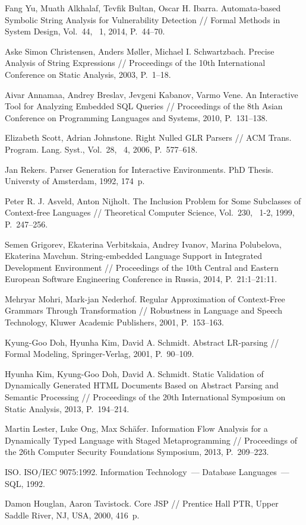 \documentclass{llncs}
\begin{document}
%
%
\begin{thebibliography}{}
%
Fang Yu, Muath Alkhalaf, Tevfik Bultan, Oscar H. Ibarra.
Automata-based Symbolic String Analysis for Vulnerability Detection //
Formal Methods in System Design, Vol.~44, \textnumero~1, 2014, P.~44--70.

Aske Simon Christensen, Anders M{\o}ller, Michael I. Schwartzbach.
Precise Analysis of String Expressions //
Proceedings of the 10th International Conference on Static Analysis, 2003, P.~1--18.

Aivar Annamaa, Andrey Breslav, Jevgeni Kabanov, Varmo Vene.
An Interactive Tool for Analyzing Embedded SQL Queries //
Proceedings of the 8th Asian Conference on Programming Languages and Systems, 2010, P.~131--138.

Elizabeth Scott, Adrian Johnstone.
Right Nulled GLR Parsers // ACM Trans. Program. Lang. Syst., Vol.~28, \textnumero~4,
2006, P.~577--618.

Jan Rekers.
Parser Generation for Interactive Environments. PhD Thesis. Universty of Amsterdam, 1992, 174~p.

Peter R. J. Asveld, Anton Nijholt.
The Inclusion Problem for Some Subclasses of Context-free Languages //
Theoretical Computer Science, Vol.~230, \textnumero~1-2, 1999, P.~247--256.

Semen Grigorev, Ekaterina Verbitskaia, Andrey Ivanov, Marina Polubelova, Ekaterina Mavchun.
String-embedded Language Support in Integrated Development Environment //
Proceedings of the 10th Central and Eastern European Software Engineering Conference in Russia, 2014, P.~21:1--21:11.

Mehryar Mohri, Mark-jan Nederhof.
Regular Approximation of Context-Free Grammars Through Transformation //
Robustness in Language and Speech Technology, Kluwer Academic Publishers, 2001, P.~153--163. 

Kyung-Goo Doh, Hyunha Kim, David A. Schmidt.
Abstract LR-parsing // Formal Modeling, Springer-Verlag, 2001, P.~90--109.

Hyunha Kim, Kyung-Goo Doh, David A. Schmidt.
Static Validation of Dynamically Generated HTML Documents Based on Abstract Parsing and Semantic Processing //
Proceedings of the 20th International Symposium on Static Analysis, 2013, P.~194--214.

Martin Lester, Luke Ong, Max Sch{\"{a}}fer.
Information Flow Analysis for a Dynamically Typed Language with Staged Metaprogramming //
Proceedings of the 26th Computer Security Foundations Symposium, 2013, P.~209--223.

ISO. ISO/IEC 9075:1992. Information Technology~--- Database Languages~--- SQL, 1992.

Damon Houglan, Aaron Tavistock. Core JSP // Prentice Hall PTR, Upper Saddle River, NJ, USA, 2000, 416~p.

\end{thebibliography}
\end{document}
